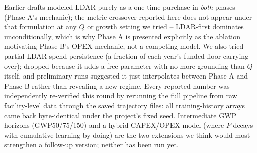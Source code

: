 \documentclass{article}
\begin{document}
{Earlier drafts modeled LDAR purely as a one-time purchase in \emph{both}
phases (Phase A's mechanic); the metric crossover reported here does not
appear under that formulation at any $Q$ or growth setting we tried --
LDAR-first dominates unconditionally, which is why Phase A is presented
explicitly as the ablation motivating Phase B's OPEX mechanic, not a
competing model. We also tried partial LDAR-spend persistence (a fraction
of each year's funded floor carrying over); dropped because it adds a
free parameter with no more grounding than $Q$ itself, and preliminary
runs suggested it just interpolates between Phase A and Phase B rather
than revealing a new regime. Every reported number was independently
re-verified this round by rerunning the full pipeline from raw
facility-level data through the saved trajectory files: all
training-history arrays came back byte-identical under the project's
fixed seed. Intermediate GWP horizons (GWP50/75/150) and a hybrid
CAPEX/OPEX model (where $P$ decays with cumulative learning-by-doing) are
the two extensions we think would most strengthen a follow-up version;
neither has been run yet.
}
\end{document}
